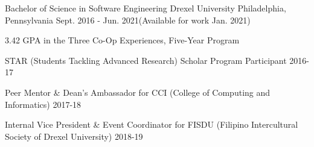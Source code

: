 

\begin{cventries}

  \cventry
    {Bachelor of Science in Software Engineering} %
    {Drexel University} %
    {Philadelphia, Pennsylvania} %
    {Sept. 2016 - Jun. 2021\linebreak(Available for work Jan. 2021)} %
    {
      \begin{cvitems} %
        \item 3.42 GPA in the Three Co-Op Experiences, Five-Year Program
        \item STAR (Students Tackling Advanced Research) Scholar Program Participant 2016-17
        \item Peer Mentor \& Dean's Ambassador for CCI (College of Computing and Informatics) 2017-18
        \item Internal Vice President \& Event Coordinator for FISDU (Filipino Intercultural Society of Drexel University) 2018-19
      \end{cvitems}
    }

\end{cventries}
